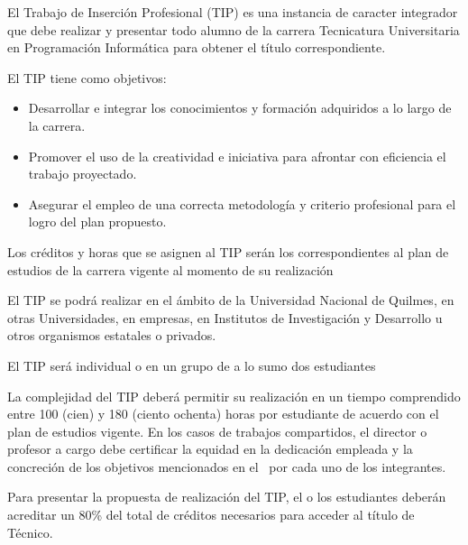 


\articulo El Trabajo de Inserción Profesional (TIP) es una instancia de
caracter integrador que debe realizar y presentar todo alumno de la carrera
Tecnicatura Universitaria en Programación Informática para obtener el título
correspondiente.

\articulo El TIP tiene como objetivos:
\begin{itemize}
 \item Desarrollar e integrar los conocimientos y formación adquiridos a lo
 largo de la carrera.
 \item Promover el uso de la creatividad e iniciativa para afrontar con
 eficiencia el trabajo proyectado.
 \item Asegurar el empleo de una correcta metodología y criterio
 profesional para el logro del plan propuesto.
\end{itemize}

\articulo Los créditos y horas que se asignen al TIP serán los
correspondientes al plan de estudios de la carrera vigente al momento de su
realización


\articulo El TIP se podrá realizar en el ámbito de la Universidad Nacional de
Quilmes, en otras Universidades, en empresas, en Institutos de Investigación y
Desarrollo u otros organismos estatales o privados. 

\articulo El TIP será individual o en un grupo de a lo sumo dos estudiantes

\articulo La complejidad del TIP deberá permitir su realización en un
tiempo comprendido entre 100 (cien) y 180 (ciento ochenta) horas por estudiante de
acuerdo con el plan de estudios vigente. En los casos de trabajos compartidos, el
director o profesor a cargo debe certificar la equidad en la dedicación empleada
y la concreción de los objetivos mencionados en el \artObjetivos\ por cada uno de los
integrantes. 

\articulo Para presentar la propuesta de realización del TIP, el o
los estudiantes deberán acreditar un 80\% del total de créditos necesarios para
acceder al título de Técnico. 

